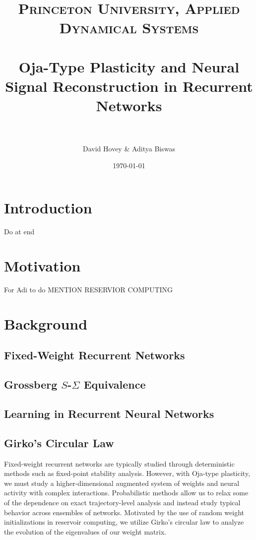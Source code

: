 \documentclass[paper=a4, fontsize=11pt]{scrartcl} %
\title{	
\normalfont \normalsize 
\textsc{Princeton University, Applied Dynamical Systems} \\ [25pt] %
\horrule{0.5pt} \\[0.4cm] %
\huge Oja-Type Plasticity and Neural Signal Reconstruction in Recurrent Networks  \\ %
\horrule{2pt} \\[0.5cm] %
}
\author{David Hovey \& Aditya Biswas} %
\date{\normalsize\today} %
\numberwithin{equation}{section} %
\numberwithin{figure}{section} %
\numberwithin{table}{section} %
\begin{document}
\maketitle %


\section{Introduction}
Do at end

\section{Motivation}
For Adi to do MENTION RESERVIOR COMPUTING

\section{Background}
\subsection{Fixed-Weight Recurrent Networks}

\subsection{Grossberg \(S\)-\(\Sigma\) Equivalence}

\subsection{Learning in Recurrent Neural Networks}

\subsection{Girko's Circular Law}
Fixed-weight recurrent networks are typically studied through deterministic methods such as fixed-point stability analysis. However, with Oja-type plasticity, we must study a higher-dimensional augmented system of weights and neural activity with  complex interactions. Probabilistic methods allow us to relax some of the dependence on exact trajectory-level analysis and instead study typical behavior across ensembles of networks. Motivated by the use of random weight initializations in reservoir computing,
we utilize Girko's circular law to analyze the evolution of the eigenvalues of our weight matrix. 
\end{document}
